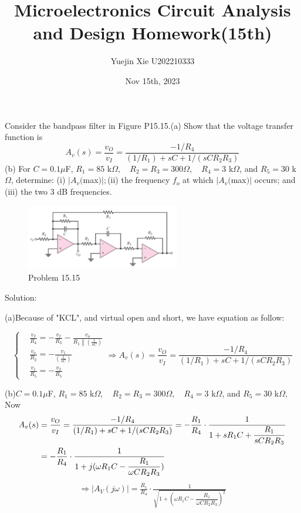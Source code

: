 \documentclass[a4paper,11pt,UTF8]{afthesis}
\title{Microelectronics Circuit Analysis and Design Homework(15th)}
\author{Yuejin Xie \quad U202210333}
\date{Nov 15th, 2023}
\begin{document}
 Consider the bandpass filter in Figure P15.15.(a) Show that the voltage transfer function is
$$
A_v(s)=\frac{v_O}{v_I}=\frac{-1/R_4}{(1/R_1)+sC+1/(sCR_2R_3)}
$$
(b) For $C= 0.1\mu$F, $R_1=85$ k$\Omega,\quad R_2=R_3=300\Omega,\quad R_4=3$ k$\Omega$, and
$R_5=30$ k$\Omega$, determine: (i) $|A_v( $max$) |; $(ii) the frequency $f_o$ at which $|A_v( $max$) |$ occurs; and (iii) the two 3 dB frequencies.


\begin{figure}[H]
	\centering
	\includegraphics[width=0.6\textwidth]{15.15}
	\caption{Problem 15.15}
\end{figure}
\noindent Solution:

(a)Because of "KCL", and virtual open and short, we have equation as follow:

$$\left\{\begin{aligned}
	&\frac{v_I}{R_4} =-\frac{v_{2}}{R_{3}}-\frac{v_{o}}{R_{1}\left\|\left(\frac{1}{sC}\right)\right.}  \\
	&\frac{v_o}{R_2} =-\frac{v_{1}}{\left(\frac1{sC}\right)}  \\
	&\frac{v_{1}}{R_{5}} =-\frac{v_{2}}{R_{5}} 
\end{aligned}\right.\Rightarrow A_v(s)=\frac{v_O}{v_I}=\frac{-1/R_4}{(1/R_1)+sC+1/(sCR_2R_3)}$$

(b)$C= 0.1\mu$F, $R_1=85$ k$\Omega,\quad R_2=R_3=300\Omega,\quad R_4=3$ k$\Omega$, and
$R_5=30$ k$\Omega$, Now
$$\begin{aligned}
	A_v(s)&=\frac{v_O}{v_I}=\frac{-1/R_4}{(1/R_1)+sC+1/(sCR_2R_3)}=-\frac{R_1}{R_4}\cdot\frac{1}{1+sR_1C+\dfrac{R_1}{sCR_2R_3}}\\
	&=-\frac{R_1}{R_4}\cdot\frac{1}{1+j(\omega R_1C-\dfrac{R_1}{\omega CR_2R_3})}
\end{aligned}\\
$$
$$
	 \begin{aligned}\Rightarrow\left|A_{V}(j\omega)\right|=\frac{R_{1}}{R_{4}}\cdot\frac{1}{\sqrt{1+(\omega R_1C-\dfrac{R_1}{\omega CR_2R_3})^2}}\end{aligned}
$$
\end{document}
